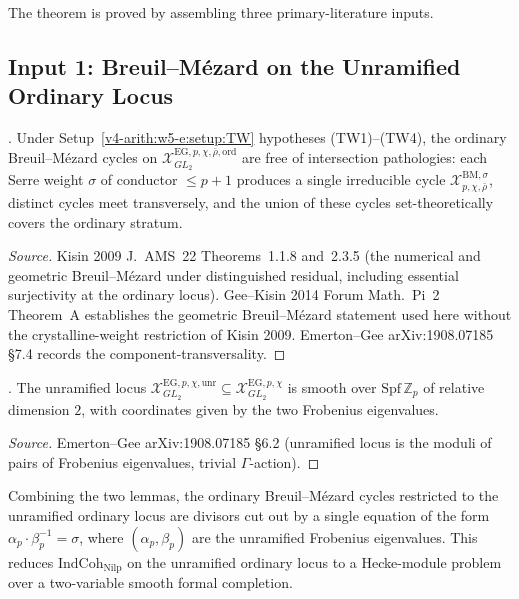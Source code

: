 The theorem is proved by assembling three primary-literature inputs.

\subsection{Input 1: Breuil--M{\'e}zard on the Unramified Ordinary Locus}

\begin{lemma}
\label{v4-arith:w5-e:lem:BM-unr-ord}
\ClaimStatusProvedElsewhere. Under
Setup~\ref{v4-arith:w5-e:setup:TW} hypotheses (TW1)--(TW4), the
ordinary Breuil--M{\'e}zard cycles on
\(\mathcal{X}^{\mathrm{EG},p,\chi,\bar\rho,\mathrm{ord}}_{GL_{2}}\)
are free of intersection pathologies: each Serre weight \(\sigma\) of
conductor \(\leq p+1\) produces a single irreducible cycle
\(\mathcal{X}^{\mathrm{BM},\sigma}_{p,\chi,\bar\rho}\), distinct
cycles meet transversely, and the union of these cycles
set-theoretically covers the ordinary stratum.
\end{lemma}

\begin{proof}[Source]
Kisin 2009 J.~AMS~22 Theorems~1.1.8 and~2.3.5 (the numerical and
geometric Breuil--M{\'e}zard under distinguished residual, including
essential surjectivity at the ordinary locus). Gee--Kisin 2014 Forum
Math.~Pi~2 Theorem~A establishes the geometric Breuil--M{\'e}zard
statement used here without the crystalline-weight restriction of
Kisin 2009. Emerton--Gee arXiv:1908.07185 \S 7.4 records the
component-transversality.
\end{proof}

\begin{lemma}
\label{v4-arith:w5-e:lem:unr-smooth}
\ClaimStatusProvedElsewhere. The unramified locus
\(\mathcal{X}^{\mathrm{EG},p,\chi,\mathrm{unr}}_{GL_{2}}\subseteq
\mathcal{X}^{\mathrm{EG},p,\chi}_{GL_{2}}\) is smooth over
\(\mathrm{Spf}\,\mathbb{Z}_{p}\) of relative dimension \(2\), with
coordinates given by the two Frobenius eigenvalues.
\end{lemma}

\begin{proof}[Source]
Emerton--Gee arXiv:1908.07185 \S 6.2 (unramified locus is the moduli
of pairs of Frobenius eigenvalues, trivial \(\Gamma\)-action).
\end{proof}

Combining the two lemmas, the ordinary Breuil--M{\'e}zard cycles
restricted to the unramified ordinary locus are divisors cut out by
a single equation of the form \(\alpha_{p}\cdot\beta_{p}^{-1}=\sigma\),
where \((\alpha_{p},\beta_{p})\) are the unramified Frobenius
eigenvalues. This reduces \(\mathrm{IndCoh}_{\mathrm{Nilp}}\) on the
unramified ordinary locus to a Hecke-module problem over a
two-variable smooth formal completion.

